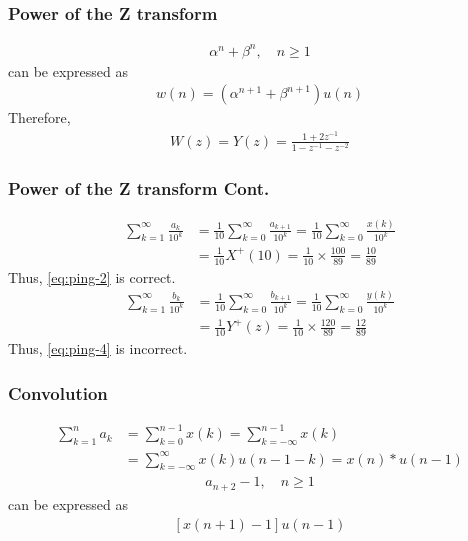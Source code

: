 \documentclass{beamer}
\providecommand{\sbrak}[1]{\ensuremath{{}\left[#1\right]}}
\providecommand{\brak}[1]{\ensuremath{\left(#1\right)}}
\theoremstyle{remark}
\numberwithin{equation}{section}
\begin{document}
\begin{frame}
	\frametitle{Power of the Z transform}
\begin{align}
	\alpha^n + \beta^n, \quad n \ge 1
    \label{eq:pingala/yn-exp}
\end{align}
can be expressed as 
\begin{align}
	w(n) = \brak{\alpha^{n+1} + \beta^{n+1}}u(n)
\end{align}
Therefore,
\begin{align}
    W(z) = Y(z) = \frac{1 + 2z^{-1}}{1 - z^{-1} - z^{-2}}
\end{align}
\end{frame}
\begin{frame}
\frametitle{Power of the Z transform Cont.}
\begin{align}
    \sum_{k=1}^{\infty}\frac{a_k}{10^k} &= \frac{1}{10}\sum_{k = 0}^{\infty}\frac{a_{k+1}}{10^k} 
                                        = \frac{1}{10}\sum_{k = 0}^{\infty}\frac{x(k)}{10^k} \\
                                        &= \frac{1}{10}X^+(10) 
                                        = \frac{1}{10}\times\frac{100}{89} = \frac{10}{89}
\end{align}
Thus,
\eqref{eq:ping-2} is correct.
\begin{align}
    \sum_{k=1}^{\infty}\frac{b_k}{10^k} &= \frac{1}{10}\sum_{k = 0}^{\infty}\frac{b_{k+1}}{10^k} 
                                        = \frac{1}{10}\sum_{k = 0}^{\infty}\frac{y(k)}{10^k} \\
                                        &= \frac{1}{10}Y^+(z) 
                                        = \frac{1}{10}\times\frac{120}{89} = \frac{12}{89}
\end{align}
Thus,
\eqref{eq:ping-4} is incorrect.
\end{frame}
\begin{frame}
\frametitle{Convolution}
\begin{align}
    \sum_{k=1}^{n}a_k &= \sum_{k=0}^{n-1}x(k) 
                      = \sum_{k = -\infty}^{n - 1}x(k) \\
                      &= \sum_{k = -\infty}^{\infty}x(k)u(n - 1 - k) 
                      = x(n)*u(n - 1)
\end{align}
\begin{align}
a_{n+2}-1, \quad n \ge 1
\end{align}
can be expressed as 
\begin{align}
	\sbrak{x\brak{n+1}-1}u\brak{n-1}
\end{align}
\end{frame}
\end{document}
